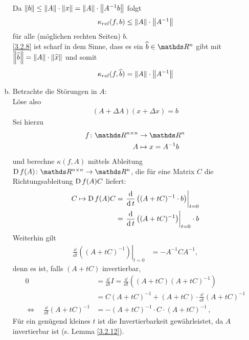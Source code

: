 \begin{Bspe}
\begin{enumerate}[a)]
    Da $\nn[b] \leq \nn[A]\cdot\nn[x] = \nn[A]\cdot \nn[A^{-1}b]$ folgt
    \begin{gather}
      \kappa_{rel}(f,b) \leq \nn[A] \cdot \nn[A^{-1}] \label{III.2.8}
    \end{gather}
    für alle (möglichen rechten Seiten) $b $.\\
    \ref{3.2.8} ist scharf in dem Sinne, dass es ein $\widehat{b}\in \R^n$ gibt 
    mit $\nn[\widehat{b}] = \nn[A]\cdot \nn[\widehat{x}]$ und somit
    \begin{gather*}
      \kappa_{rel}(f,\widehat{b}) = \nn[A]\cdot \nn[ A^{-1}]
    \end{gather*}
  \item Betrachte die Störungen in $A$:\\
    Löse also 
    \begin{gather*}
      (A+\Delta A)(x+\Delta x) = b
    \end{gather*}
    Sei hierzu
    \begin{align*}
      f\colon \R^{n\times n}&\to\R^n\\
      A&\mapsto x= A^{-1}b 
    \end{align*}
    und berechne $\kappa(f,A)$ mittels Ableitung
    $\D f(A)\colon\R^{n\times n}\to \R^n$, die für eine Matrix $C$ 
    die Richtungsableitung $\D f(A)C$ liefert:
    \begin{align*}
      C\mapsto \D f(A) C
      &=  \left.
        \frac{\dd}{\dd t}\left((A+tC)^{-1} \cdot b\right)
        \right|_{t=0} \\
      & = \left.
        \frac{\dd}{\dd t}\left((A+tC)^{-1}\right)
        \right|_{t=0}\cdot b
    \end{align*}			
    Weiterhin gilt
    \begin{align}
      \left. \frac{\dd}{\dd t} \left((A+tC)^{-1}\right) \right|_{t=0} 
      &=-A^{-1}CA^{-1},
        \label{III.2.9}
    \end{align}
    denn es ist, falls $(A+tC)$ invertierbar,
    \begin{align*}
      0 &= \frac{\dd}{\dd t}I
          = \frac{\dd}{\dd t}\left( (A+tC)(A+tC)^{-1}\right)\\
        &= C(A+tC)^{-1} +(A+tC)\cdot \frac{\dd}{\dd t}(A+tC)^{-1} \\
      \Longleftrightarrow\quad \frac{\dd}{\dd t} (A+ tC)^{-1} 
        &= -(A+tC)^{-1} \cdot C\cdot (A+tC)^{-1} \, ,
    \end{align*}
    Für ein genügend kleines $t$ ist die Invertierbarkeit
    gewährleistet, da $A$ invertierbar ist (s. Lemma \ref{3.2.12}).

\end{enumerate}
\end{Bspe}
